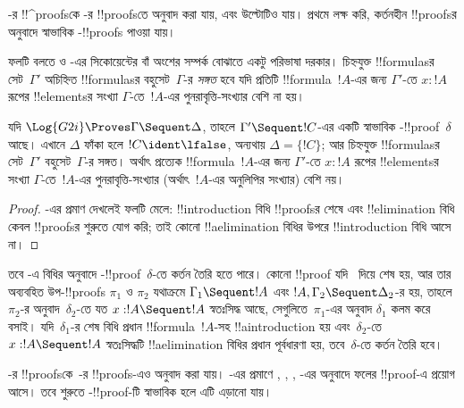 \documentclass[../../../include/open-logic-section]{subfiles}
\begin{document}


-র !!^{proof}sকে -র
!!{proof}sতে অনুবাদ করা যায়, এবং উল্টোটিও যায়।
প্রথমে লক্ষ করি, কর্তনহীন 
!!{proof}sর অনুবাদে স্বাভাবিক
-!!{proof}s পাওয়া যায়।

ফলটি বলতে  ও -এর
সিকোয়েন্টের বাঁ অংশের সম্পর্ক বোঝাতে
একটু পরিভাষা দরকার। চিহ্নযুক্ত
!!{formula}sর সেট~$\Gamma'$ অচিহ্নিত
!!{formula}sর বহুসেট~$\Gamma$-র
\emph{সঙ্গত} হবে যদি প্রতিটি
!!{formula}~$!A$-এর জন্য
$\Gamma'$-তে $x : !A$ রূপের
!!{element}sর সংখ্যা
$\Gamma$-তে~$!A$-এর পুনরাবৃত্তি-সংখ্যার
বেশি না হয়।

\begin{cor}
যদি $\Log{G2i} \Proves \Gamma \Sequent \Delta$,
তাহলে $\Gamma' \Sequent !C$-এর
একটি স্বাভাবিক -!!{proof}~$\delta$
আছে। এখানে $\Delta$ ফাঁকা হলে
$!C \ident \lfalse$, অন্যথায়
$\Delta=\{!C\}$; আর চিহ্নযুক্ত
!!{formula}sর সেট~$\Gamma'$
বহুসেট~$\Gamma$-র সঙ্গত।
অর্থাৎ প্রত্যেক !!{formula}~$!A$-এর
জন্য $\Gamma'$-তে $x : !A$ রূপের
!!{element}sর সংখ্যা
$\Gamma$-তে~$!A$-এর পুনরাবৃত্তি-সংখ্যার
(অর্থাৎ~$!A$-এর অনুলিপির সংখ্যার)
বেশি নয়।
\end{cor}

\begin{proof}
-এর
প্রমাণ দেখলেই ফলটি মেলে:
!!{introduction} বিধি !!{proof}sর শেষে
এবং !!{elimination} বিধি কেবল
!!{proof}sর শুরুতে যোগ করি; তাই কোনো
!!a{elimination} বিধির উপরে
!!{introduction} বিধি আসে না।
\end{proof}

তবে -এ
\Cut{} বিধির অনুবাদে -!!{proof}~$\delta$-তে
কর্তন তৈরি হতে পারে। কোনো 
!!{proof} যদি~\Cut{} দিয়ে শেষ হয়,
আর তার অব্যবহিত উপ-!!{proof}s
$\pi_1$ ও $\pi_2$ যথাক্রমে
$\Gamma_1 \Sequent !A$ এবং
$!A, \Gamma_2 \Sequent \Delta_2$-র হয়,
তাহলে~$\pi_2$-র অনুবাদ~$\delta_2$-তে
যত $x:!A \Sequent !A$ স্বতঃসিদ্ধ
আছে, সেগুলিতে~$\pi_1$-এর অনুবাদ
$\delta_1$ কলম করে বসাই।
যদি~$\delta_1$-র শেষ বিধি
প্রধান !!{formula}~$!A$-সহ
!!a{introduction} হয় এবং~$\delta_2$-তে
$x:!A \Sequent !A$ স্বতঃসিদ্ধটি
!!a{elimination} বিধির প্রধান পূর্বধারণা
হয়, তবে~$\delta$-তে কর্তন তৈরি হবে।

-র !!{proof}sকে~-র
!!{proof}s-এও অনুবাদ করা যায়।
-এর
প্রমাণে \Elim{\land}, \Elim{\lif},
\Elim{\lnot}, \Elim{\lforall}-এর
অনুবাদে ফলের  !!{proof}-এ
\Cut{} প্রয়োগ আসে। তবে শুরুতে
-!!{proof}-টি স্বাভাবিক হলে
এটি এড়ানো যায়।
\end{document}
